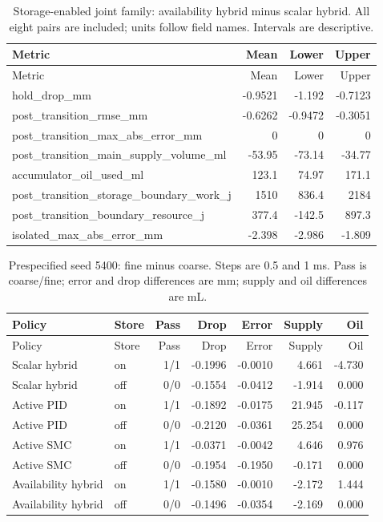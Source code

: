 \begingroup\hypersetup{hypertexnames=true}\small\setlength{\tabcolsep}{4pt}
\begin{longtable}{lrrr}
\caption{Storage-enabled joint family: availability hybrid minus scalar hybrid. All eight pairs are included; units follow field names. Intervals are descriptive.}\\\toprule
Metric & Mean & Lower & Upper\\\midrule\endfirsthead
\toprule
Metric & Mean & Lower & Upper\\\midrule\endhead
hold\_drop\_mm & -0.9521 & -1.192 & -0.7123\\
post\_transition\_rmse\_mm & -0.6262 & -0.9472 & -0.3051\\
post\_transition\_max\_abs\_error\_mm & 0 & 0 & 0\\
post\_transition\_main\_supply\_volume\_ml & -53.95 & -73.14 & -34.77\\
accumulator\_oil\_used\_ml & 123.1 & 74.97 & 171.1\\
post\_transition\_storage\_boundary\_work\_j & 1510 & 836.4 & 2184\\
post\_transition\_boundary\_resource\_j & 377.4 & -142.5 & 897.3\\
isolated\_max\_abs\_error\_mm & -2.398 & -2.986 & -1.809\\
\bottomrule\end{longtable}\endgroup

\begingroup\hypersetup{hypertexnames=true}\small\setlength{\tabcolsep}{4pt}
\begin{longtable}{llrrrrr}
\caption{Prespecified seed 5400: fine minus coarse. Steps are 0.5 and 1 ms. Pass is coarse/fine; error and drop differences are mm; supply and oil differences are mL.}\\\toprule
Policy & Store & Pass & Drop & Error & Supply & Oil\\\midrule\endfirsthead
\toprule
Policy & Store & Pass & Drop & Error & Supply & Oil\\\midrule\endhead
Scalar hybrid & on & 1/1 & -0.1996 & -0.0010 & 4.661 & -4.730\\
Scalar hybrid & off & 0/0 & -0.1554 & -0.0412 & -1.914 & 0.000\\
Active PID & on & 1/1 & -0.1892 & -0.0175 & 21.945 & -0.117\\
Active PID & off & 0/0 & -0.2120 & -0.0361 & 25.254 & 0.000\\
Active SMC & on & 1/1 & -0.0371 & -0.0042 & 4.646 & 0.976\\
Active SMC & off & 0/0 & -0.1954 & -0.1950 & -0.171 & 0.000\\
Availability hybrid & on & 1/1 & -0.1580 & -0.0010 & -2.172 & 1.444\\
Availability hybrid & off & 0/0 & -0.1496 & -0.0354 & -2.169 & 0.000\\
\bottomrule\end{longtable}\endgroup

